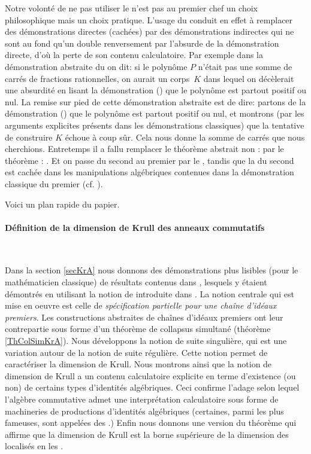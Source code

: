 Notre volonté de ne pas utiliser le \tcg n'est pas au premier chef un 
choix philosophique mais un choix pratique. L'usage du \tcg conduit en 
effet à remplacer des démonstrations directes (cachées) par des démonstrations 
indirectes qui ne sont au fond qu'un double renversement par l'absurde de 
la démonstration directe, d'où la perte de son contenu calculatoire. Par 
exemple dans la démonstration abstraite du \disept on dit: si le polynôme $P$ 
n'était pas une somme de carrés de fractions rationnelles, on aurait 
un corps~$K$ dans lequel on décèlerait une absurdité en lisant la 
démonstration (\cov) que le polynôme est partout positif ou nul. La remise sur 
pied de cette démonstration abstraite est de dire: partons de la démonstration (\cov) 
que le polynôme est partout positif ou nul, et montrons (par les arguments 
explicites présents dans les démonstrations classiques) que la tentative de 
construire $K$ échoue à coup s\^ur. Cela nous donne la somme de 
carrés que nous cherchions. Entretemps il a fallu remplacer le 
théorème abstrait non \cof:  par le théorème \cof: . Et on 
passe du second au premier par le \tcg, tandis que la \prco du second est 
cachée dans les manipulations algébriques contenues dans la démonstration 
classique du premier (cf. \cite{lom98}).  

\mni Voici un plan rapide du papier.


\paragraph{Définition \cov de la dimension de Krull des anneaux 
commutatifs}~

\noindent Dans la section \ref{secKrA} nous donnons des démonstrations plus 
lisibles (pour le mathématicien classique) de résultats contenus dans \cite{lom}, lesquels y 
étaient démontrés en utilisant la notion de \sad introduite dans \cite[Coste, Lombardi, Roy]{clr}. 
La notion centrale qui est mise en oeuvre est celle de {\em 
spécification partielle pour une chaîne  d'idéaux premiers}. 
Les constructions abstraites de chaînes  d'idéaux premiers ont leur 
contrepartie \cov sous forme d'un théorème de collapsus simultané
(théorème \ref{ThColSimKrA}). Nous développons la notion de suite 
singulière, qui est une variation \cov autour de la notion   de suite 
régulière. Cette notion permet de caractériser \cot la dimension de Krull.
Nous montrons ainsi que la notion de dimension de Krull a un contenu 
calculatoire explicite en terme d'existence (ou non) de certains types 
d'identités algébriques. Ceci confirme l'adage selon lequel 
l'algèbre commutative admet une interprétation calculatoire sous forme de 
machineries de productions d'identités algébriques (certaines, parmi les 
plus fameuses, sont appelées des \nsts.) Enfin nous donnons une version 
\cov du théorème qui affirme que la dimension de Krull est la borne 
supérieure
de la dimension des localisés en les \idemas. 

